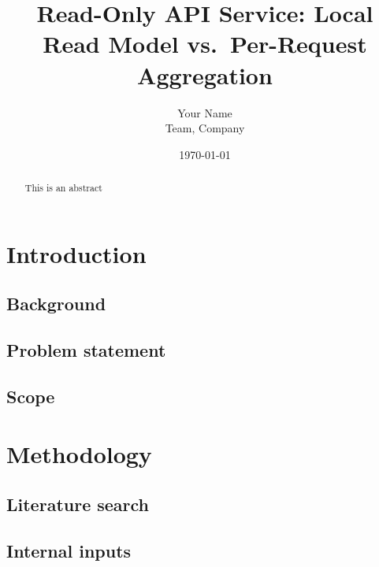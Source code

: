 \documentclass[11pt,a4paper]{article}
\title{Read-Only API Service: Local Read Model vs.\ Per-Request Aggregation}
\author{Your Name \\ Team, Company}
\date{\today}
\begin{document}
\maketitle

\begin{abstract}
\noindent

This is an abstract  \parencite{richardson2018}

\end{abstract}

\tableofcontents

\section{Introduction}

\subsection{Background}

\subsection{Problem statement}

\subsection{Scope}

\section{Methodology}

\subsection{Literature search}

\subsection{Internal inputs}
\end{document}
